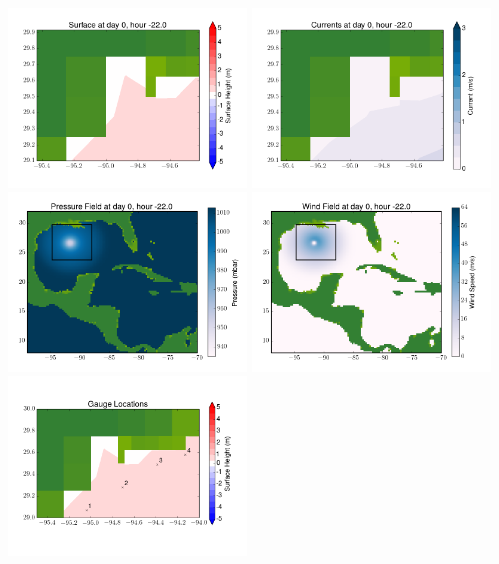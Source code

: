 \documentclass[11pt]{article}
\begin{document}
\includegraphics[width=0.475\textwidth]{frame0050fig6.png}
\vskip 10pt 
\includegraphics[width=0.475\textwidth]{frame0050fig7.png}
\includegraphics[width=0.475\textwidth]{frame0050fig8.png}
\vskip 10pt 
\includegraphics[width=0.475\textwidth]{frame0050fig9.png}
\includegraphics[width=0.475\textwidth]{frame0050fig10.png}
\end{document}
